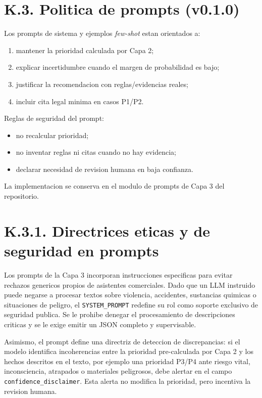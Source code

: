 \section*{K.3. Politica de prompts (v0.1.0)}

Los prompts de sistema y ejemplos \textit{few-shot} estan orientados a:

\begin{enumerate}
    \item mantener la prioridad calculada por Capa 2;
    \item explicar incertidumbre cuando el margen de probabilidad es bajo;
    \item justificar la recomendacion con reglas/evidencias reales;
    \item incluir cita legal minima en casos P1/P2.
\end{enumerate}

Reglas de seguridad del prompt:

\begin{itemize}
    \item no recalcular prioridad;
    \item no inventar reglas ni citas cuando no hay evidencia;
    \item declarar necesidad de revision humana en baja confianza.
\end{itemize}

La implementacion se conserva en el modulo de prompts de Capa 3 del repositorio.

\section*{K.3.1. Directrices eticas y de seguridad en prompts}

Los prompts de la Capa 3 incorporan instrucciones especificas para evitar rechazos
genericos propios de asistentes comerciales. Dado que un LLM instruido puede negarse a
procesar textos sobre violencia, accidentes, sustancias quimicas o situaciones de
peligro, el \texttt{SYSTEM\_PROMPT} redefine su rol como soporte exclusivo de seguridad
publica. Se le prohibe denegar el procesamiento de descripciones criticas y se le exige
emitir un JSON completo y supervisable.

Asimismo, el prompt define una directriz de deteccion de discrepancias: si el modelo
identifica incoherencias entre la prioridad pre-calculada por Capa 2 y los hechos
descritos en el texto, por ejemplo una prioridad P3/P4 ante riesgo vital, inconsciencia,
atrapados o materiales peligrosos, debe alertar en el campo
\texttt{confidence\_disclaimer}. Esta alerta no modifica la prioridad, pero incentiva la
revision humana.

